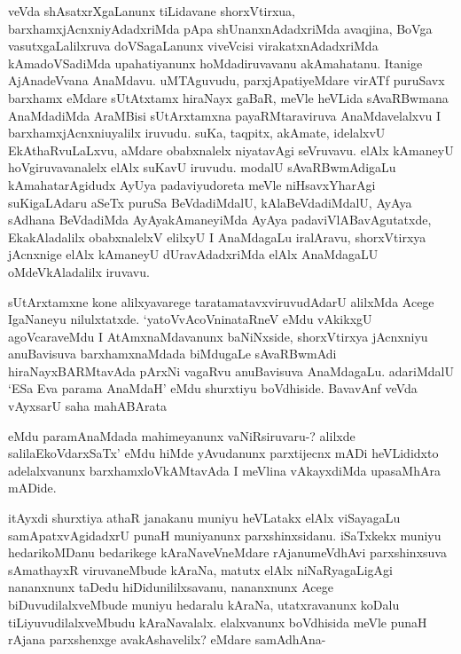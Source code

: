 \begin{artha}
veVda shAsatxrXgaLanunx tiLidavane shorxVtirxua, barxhamxjAcnxniyAdadxriMda pApa shUnanxnAdadxriMda avaqjina, BoVga vasutxgaLalilxruva doVSagaLanunx viveVcisi virakatxnAdadxriMda kAmadoVSadiMda upahatiyanunx hoMdadiruvavanu akAmahatanu. Itanige AjAnadeVvana AnaMdavu. uMTAguvudu, parxjApatiyeMdare virATf puruSavx barxhamx eMdare sUtAtxtamx hiraNayx gaBaR, meVle heVLida sAvaRBwmana AnaMdadiMda AraMBisi sUtArxtamxna payaRMtaraviruva AnaMdavelalxvu I barxhamxjAcnxniuyalilx iruvudu. suKa, taqpitx, akAmate, idelalxvU EkAthaRvuLaLxvu, aMdare obabxnalelx niyatavAgi seVruvavu. elAlx kAmaneyU hoVgiruvavanalelx elAlx suKavU iruvudu. modalU sAvaRBwmAdigaLu kAmahatarAgidudx AyUya padaviyudoreta meVle niHsavxYharAgi suKigaLAdaru aSeTx puruSa BeVdadiMdalU, kAlaBeVdadiMdalU, AyAya sAdhana BeVdadiMda AyAyakAmaneyiMda AyAya padaviVlABavAgutatxde, EkakAladalilx obabxnalelxV elilxyU I AnaMdagaLu iralAravu, shorxVtirxya jAcnxnige elAlx kAmaneyU dUravAdadxriMda elAlx AnaMdagaLU oMdeVkAladalilx iruvavu. 
\end{artha}


\begin{artha}
sUtArxtamxne kone alilxyavarege taratamatavxviruvudAdarU alilxMda Acege IgaNaneyu nilulxtatxde. `yatoVvAcoVninataRneV eMdu vAkikxgU agoVcaraveMdu I AtAmxnaMdavanunx baNiNxside, shorxVtirxya jAcnxniyu anuBavisuva barxhamxnaMdada biMdugaLe sAvaRBwmAdi hiraNayxBARMtavAda pArxNi vagaRvu anuBavisuva AnaMdagaLu. adariMdalU `ESa Eva parama AnaMdaH' eMdu shurxtiyu boVdhiside. BavavAnf veVda vAyxsarU saha mahABArata 
\end{artha}%

\begin{artha}
eMdu paramAnaMdada mahimeyanunx vaNiRsiruvaru-? alilxde salilaEkoVdarxSaTx' eMdu hiMde yAvudanunx parxtijecnx mADi heVLididxto adelalxvanunx barxhamxloVkAMtavAda I meVlina vAkayxdiMda upasaMhAra mADide. 
\end{artha}

\begin{artha}
\stext itAyxdi shurxtiya athaR janakanu muniyu heVLatakx elAlx viSayagaLu samApatxvAgidadxrU punaH muniyanunx parxshinxsidanu. iSaTxkekx muniyu hedarikoMDanu bedarikege kAraNaveVneMdare rAjanumeVdhAvi parxshinxsuva sAmathayxR viruvaneMbude kAraNa, matutx elAlx niNaRyagaLigAgi nananxnunx taDedu hiDidunililxsavanu, nananxnunx Acege biDuvudilalxveMbude muniyu hedaralu kAraNa, utatxravanunx koDalu tiLiyuvudilalxveMbudu kAraNavalalx. elalxvanunx boVdhisida meVle punaH rAjana parxshenxge avakAshavelilx? eMdare samAdhAna-
\end{artha}

